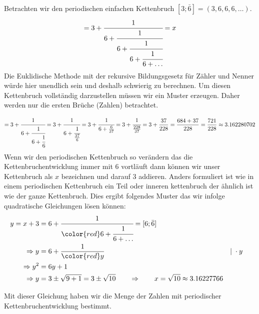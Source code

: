 \begin{beispiel}
Betrachten wir den periodischen einfachen Kettenbruch $[3;\bar{6}] = (3,6,6,6,\dots)$.
\begin{equation}
[3;\bar{6}]
=
3 + \cfrac{1}{6+\cfrac{1}{6+\cfrac{1}{6+\cfrac{1}{6+\dots}}}}
=
x
\end{equation}
Die Euklidische Methode mit der rekursive Bildungsgesetz für Zähler
und Nenner würde hier unendlich sein und deshalb schwierig zu
berechnen.
Um diesen Kettenbruch vollständig darzustellen müssen wir ein Muster
erzeugen. Daher werden nur die ersten Brüche (Zahlen) betrachtet.

\begin{equation}
[3;6,6,6]
=
3 + \cfrac{1}{6+\cfrac{1}{6+\cfrac{1}{6}}}
=
3 + \cfrac{1}{6+\cfrac{1}{\frac{37}{6}}}
=
3 + \cfrac{1}{6+\frac{6}{37}}
=
3 + \cfrac{1}{\frac{228}{37}}
=
3 + \frac{37}{228}
=
\frac{684+37}{228}
=
\frac{721}{228}
\approx
3.162280702
\end{equation}
Wenn wir den periodischen Kettenbruch so verändern das die Kettenbruchentwicklung 
immer mit 6 vortläuft dann können wir unser Kettenbruch als $x$ bezeichnen 
und darauf 3 addieren. Anders formuliert ist wie in einem periodischen Kettenbruch 
ein {\color{red}Teil oder inneren kettenbruch} der ähnlich ist wie der ganze Kettenbruch. Dies ergibt 
folgendes Muster das wir infolge quadratische
Gleichungen lösen können:
\begin{align*}
y = x+3 &= 6 + \cfrac{1}{\color{red}6+\cfrac{1}{6+\dots}} = [6;\bar{6}]
\\
\Rightarrow y &= 6 + \frac{1}{{\color{red}y}}	&&\vert\;\cdot y
\\
\Rightarrow y^2 &= 6y + 1
\\
\Rightarrow y &= 3\pm \sqrt{9+1} = 3 \pm \sqrt{10}\qquad\Rightarrow\qquad x = \sqrt{10}
\approx
3.16227766
\end{align*}
\end{beispiel}

Mit dieser Gleichung haben wir die Menge der Zahlen mit periodischer 
Kettenbruchentwicklung bestimmt. 

